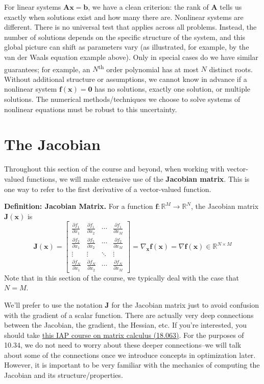 For linear systems $\mathbf{Ax=b}$, we have a clean criterion: the rank of $\mathbf{A}$ tells us exactly when solutions exist and how many there are. Nonlinear systems are different. There is no universal test that applies across all problems. Instead, the number of solutions depends on the specific structure of the system, and this global picture can shift as parameters vary (as illustrated, for example, by the van der Waals equation example above). Only in special cases do we have similar guarantees; for example, an $N$\textsuperscript{th} order polynomial has at most $N$ distinct roots. Without additional structure or assumptions, we cannot know in advance if a nonlinear system $\mathbf{f(x)=0}$ has no solutions, exactly one solution, or multiple solutions. The numerical methods/techniques we choose to solve systems of nonlinear equations must be robust to this uncertainty.

\section{The Jacobian}

Throughout this section of the course and beyond, when working with vector-valued functions, we will make extensive use of the \textbf{Jacobian matrix}. This is one way to refer to the first derivative of a vector-valued function.

\begin{definitionBox}
\textbf{Definition: Jacobian Matrix.}
For a function $\mathbf{f}: \mathbb{R}^M \rightarrow \mathbb{R}^N$, the Jacobian matrix $\mathbf{J}(\mathbf{x})$ is
{\renewcommand{\arraystretch}{1.5}
\begin{equation}
\mathbf{J}(\mathbf{x}) = \begin{bmatrix}
\frac{\partial f_1}{\partial x_1} & \frac{\partial f_1}{\partial x_2} & \cdots & \frac{\partial f_1}{\partial x_M} \\
\frac{\partial f_2}{\partial x_1} & \frac{\partial f_2}{\partial x_2} & \cdots & \frac{\partial f_2}{\partial x_M} \\
\vdots & \vdots & \ddots & \vdots \\
\frac{\partial f_N}{\partial x_1} & \frac{\partial f_N}{\partial x_2} & \cdots & \frac{\partial f_N}{\partial x_M}
\end{bmatrix} = \nabla_{\mathbf{x}}\mathbf{f}(\mathbf{x}) = \nabla\mathbf{f}(\mathbf{x}) \in \mathbb{R}^{N \times M}
\end{equation}
}
Note that in this section of the course, we typically deal with the case that $N=M$.
\end{definitionBox}
We'll prefer to use the notation $\mathbf{J}$ for the Jacobian matrix just to avoid confusion with the gradient of a scalar function. There are actually very deep connections between the Jacobian, the gradient, the Hessian, etc. If you're interested, you should take \href{https://github.com/mitmath/matrixcalc}{this IAP course on matrix calculus (18.063)}. For the purposes of 10.34, we do not need to worry about these deeper connections--we will talk about some of the connections once we introduce concepts in optimization later. However, it is important to be very familiar with the mechanics of computing the Jacobian and its structure/properties.

